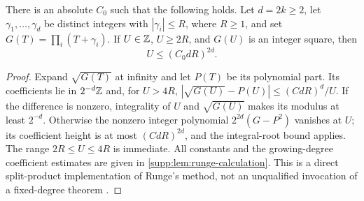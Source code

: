 \begin{lemma}\label{lem:runge}
There is an absolute $C_0$ such that the following holds. Let $d=2k\ge2$,
let $\gamma_1,\ldots,\gamma_d$ be distinct integers with
$|\gamma_i|\le R$, where $R\ge1$, and set $G(T)=\prod_i(T+\gamma_i)$.
If $U\in\mathbb Z$, $U\ge2R$, and $G(U)$ is an integer square, then
\begin{equation}\label{eq:runge-bound}
 U\le(C_0dR)^{2d}.
\end{equation}
\end{lemma}
\begin{proof}
Expand $\sqrt{G(T)}$ at infinity and let $P(T)$ be its polynomial part.
Its coefficients lie in $2^{-d}\mathbb Z$ and, for $U>4R$,
$|\sqrt{G(U)}-P(U)|\le(CdR)^d/U$.
If the difference is nonzero, integrality of $U$ and $\sqrt{G(U)}$ makes
its modulus at least $2^{-d}$. Otherwise the nonzero integer polynomial
$2^{2d}(G-P^2)$ vanishes at $U$; its coefficient height is at most
$(CdR)^{2d}$, and the integral-root bound applies. The range $2R\le U\le4R$
is immediate. All constants and the growing-degree coefficient estimates
are given in \cref{supp:lem:runge-calculation}. This is a direct
split-product implementation of Runge's method, not an unqualified
invocation of a fixed-degree theorem \cite{Runge1887,Walsh1992,Walsh1995Corrections}.
\end{proof}


